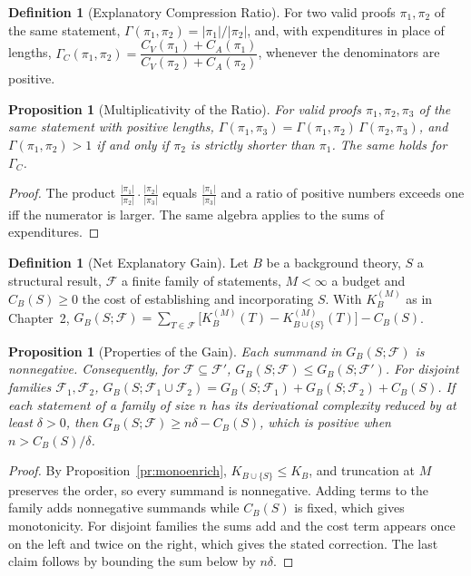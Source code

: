 \documentclass[11pt,letterpaper]{report}
\theoremstyle{plain}
\newtheorem{proposition}[theorem]{Proposition}
\theoremstyle{definition}
\newtheorem{definition}[theorem]{Definition}
\theoremstyle{remark}
\begin{document}
\begin{definition}[Explanatory Compression Ratio]
For two valid proofs $\pi_1,\pi_2$ of the same statement, $\Gamma(\pi_1,\pi_2)=|\pi_1|/|\pi_2|$, and, with expenditures in place of lengths, $\Gamma_C(\pi_1,\pi_2)=\dfrac{C_V(\pi_1)+C_A(\pi_1)}{C_V(\pi_2)+C_A(\pi_2)}$, whenever the denominators are positive.
\end{definition}

\begin{proposition}[Multiplicativity of the Ratio]
For valid proofs $\pi_1,\pi_2,\pi_3$ of the same statement with positive lengths, $\Gamma(\pi_1,\pi_3)=\Gamma(\pi_1,\pi_2)\,\Gamma(\pi_2,\pi_3)$, and $\Gamma(\pi_1,\pi_2)>1$ if and only if $\pi_2$ is strictly shorter than $\pi_1$. The same holds for $\Gamma_C$.
\end{proposition}
\begin{proof}
The product $\frac{|\pi_1|}{|\pi_2|}\cdot\frac{|\pi_2|}{|\pi_3|}$ equals $\frac{|\pi_1|}{|\pi_3|}$ and a ratio of positive numbers exceeds one iff the numerator is larger. The same algebra applies to the sums of expenditures.
\end{proof}

\begin{definition}[Net Explanatory Gain]\label{def:gain}
Let $B$ be a background theory, $S$ a structural result, $\mathcal F$ a finite family of statements, $M<\infty$ a budget and $C_B(S)\ge0$ the cost of establishing and incorporating $S$. With $K_B^{(M)}$ as in Chapter~2, $G_B(S;\mathcal F)=\sum_{T\in\mathcal F}\bigl[K_B^{(M)}(T)-K_{B\cup\{S\}}^{(M)}(T)\bigr]-C_B(S)$.
\end{definition}

\begin{proposition}[Properties of the Gain]\label{pr:gain}
Each summand in $G_B(S;\mathcal F)$ is nonnegative. Consequently, for $\mathcal F\subseteq\mathcal F'$, $G_B(S;\mathcal F)\le G_B(S;\mathcal F')$. For disjoint families $\mathcal F_1,\mathcal F_2$, $G_B(S;\mathcal F_1\cup\mathcal F_2)=G_B(S;\mathcal F_1)+G_B(S;\mathcal F_2)+C_B(S)$. If each statement of a family of size $n$ has its derivational complexity reduced by at least $\delta>0$, then $G_B(S;\mathcal F)\ge n\delta-C_B(S)$, which is positive when $n>C_B(S)/\delta$.
\end{proposition}
\begin{proof}
By Proposition~\ref{pr:monoenrich}, $K_{B\cup\{S\}}\le K_B$, and truncation at $M$ preserves the order, so every summand is nonnegative. Adding terms to the family adds nonnegative summands while $C_B(S)$ is fixed, which gives monotonicity. For disjoint families the sums add and the cost term appears once on the left and twice on the right, which gives the stated correction. The last claim follows by bounding the sum below by $n\delta$.
\end{proof}
\end{document}

